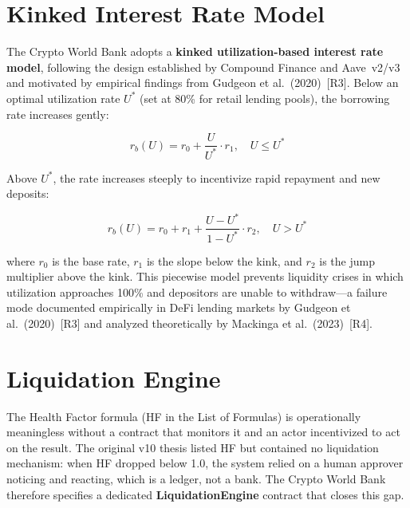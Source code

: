 \documentclass[12pt,a4paper]{report}
\begin{document}
\section{Kinked Interest Rate Model}
\label{sec:kinked-rate}

The Crypto World Bank adopts a \textbf{kinked utilization-based interest rate model}, following the design established by Compound Finance and Aave~v2/v3 and motivated by empirical findings from Gudgeon et al.~(2020)~[R3]. Below an optimal utilization rate $U^*$ (set at 80\% for retail lending pools), the borrowing rate increases gently:

\begin{equation}
r_b(U) = r_0 + \frac{U}{U^*} \cdot r_1, \quad U \leq U^* \tag{Formula 18}
\end{equation}

Above $U^*$, the rate increases steeply to incentivize rapid repayment and new deposits:

\begin{equation}
r_b(U) = r_0 + r_1 + \frac{U - U^*}{1 - U^*} \cdot r_2, \quad U > U^* \tag{Formula 19}
\end{equation}

where $r_0$ is the base rate, $r_1$ is the slope below the kink, and $r_2$ is the jump multiplier above the kink. This piecewise model prevents liquidity crises in which utilization approaches 100\% and depositors are unable to withdraw---a failure mode documented empirically in DeFi lending markets by Gudgeon et al.~(2020)~[R3] and analyzed theoretically by Mackinga et al.~(2023)~[R4].

\section{Liquidation Engine}
\label{sec:liquidation}

The Health Factor formula (HF in the List of Formulas) is operationally meaningless without a contract that monitors it and an actor incentivized to act on the result. The original v10 thesis listed HF but contained no liquidation mechanism: when HF dropped below 1.0, the system relied on a human approver noticing and reacting, which is a ledger, not a bank. The Crypto World Bank therefore specifies a dedicated \textbf{LiquidationEngine} contract that closes this gap.
\end{document}
